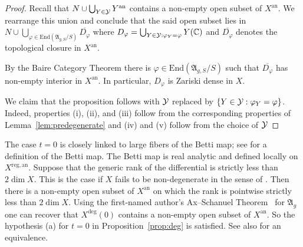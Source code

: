 \documentclass[12pt,oneside]{amsart}
\begin{document}
\begin{proof}
  Recall that  $N\cup{\bigcup_{Y\in {\mathcal Y}} Y^{\mathrm{an}}}$
  contains a non-empty
  open subset of $ X^{\mathrm{an}}$. We rearrange this union and
  conclude that the said open subset lies in 
  $N\cup \bigcup_{\varphi\in  \mathrm{End}(\mathfrak{A}_{g,S}/S)}
  \overline{D_\varphi}$ where $D_\varphi= 
  {\bigcup_{Y\in {\mathcal Y}: \varphi_Y= \varphi} Y({\mathbb{C}})}$
  and $\overline{D_\varphi}$ denotes
  the topological closure in $X^{\mathrm{an}}$. %
  
  By the Baire Category Theorem there is $\varphi\in \mathrm{End}(\mathfrak{A}_{g,S}/S)$
  such that $\overline{D_\varphi}$
  has
   non-empty interior in $X^{\mathrm{an}}$. In particular, $D_\varphi$
   is Zariski dense in $X$. %

   We claim that the proposition follows with ${\mathcal Y}$ replaced by $\{Y\in {\mathcal Y} :
   \varphi_Y = \varphi\}$. Indeed, properties (i), (ii), and (iii) follow from
   the corresponding properties of Lemma~\ref{lem:predegenerate} and
   (iv) and (v) follow from the choice of ${\mathcal Y}$
\end{proof}

\begin{remark}
  \label{rmk:bettirank}
  The case $t=0$ is closely linked to large fibers of the Betti map;
  see \cite[$\mathsection$3]{GaoBettiRank} for a definition of the
  Betti map. The Betti map is real analytic and defined locally on
  $X^{\mathrm{reg,an}}$.
  Suppose
  that the
  generic rank of the differential is strictly less than $2\dim X$.
  This is the case if $X$ fails to be non-degenerate in the sense of \cite[Definition~1.5]{DGHUnifML}.   
  Then there is a non-empty  open subset of $X^{\mathrm{an}}$ on which
  the  rank  is pointwise strictly less than $2\dim X$.
  Using the first-named author's Ax--Schanuel Theorem~\cite{GaoMixedAS} for
  $\mathfrak{A}_g$ one can recover that
  $X^{\mathrm{deg}}(0)$ contains a non-empty open subset of
  $X^{\mathrm{an}}$.
  So the hypothesis (a) for $t=0$ in Proposition~\ref{prop:deg} is satisfied.
  See also \cite[Theorem~1.7]{GaoBettiRank} for an equivalence.
\end{remark}
\end{document}
